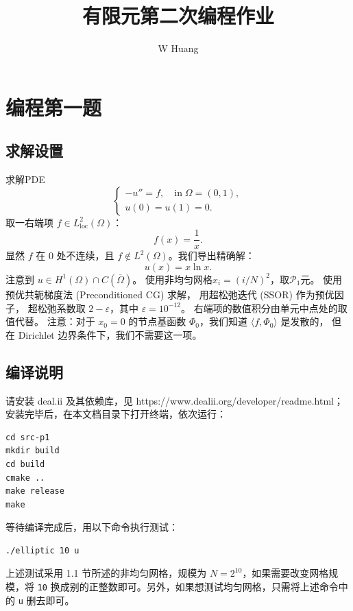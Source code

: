 \documentclass[lang=cn,11pt,a4paper]{elegantpaper}
\title{有限元第二次编程作业}
\author{W Huang}
\date{\zhtoday}
\begin{document}
\maketitle

\section{编程第一题}

\subsection{求解设置}

求解PDE
\begin{equation}
    \left\{
        \begin{array}{l}
            -u'' = f,\quad \text{in}\;\Omega=(0,1),\\
            u(0) = u(1) = 0.
        \end{array}
    \right.
\end{equation}
取一右端项 $f\in L_\text{loc}^2(\Omega)$：
\begin{equation}
    f(x)=\frac{1}{x}.
\end{equation}
显然 $f$ 在 $0$ 处不连续，且 $f\notin L^2(\Omega)$。我们导出精确解：
\begin{equation}
    u(x)=x\ln x.
\end{equation}
注意到 $u\in H^1(\Omega)\cap C(\overline{\Omega})$。
使用非均匀网格$x_i=(i/N)^2$，取$\mathcal{P}_1$元。
使用预优共轭梯度法 (Preconditioned CG) 求解，
用超松弛迭代 (SSOR) 作为预优因子，
超松弛系数取 $2-\varepsilon$，其中 $\varepsilon=10^{-12}$。
右端项的数值积分由单元中点处的取值代替。
注意：对于 $x_0=0$ 的节点基函数 $\Phi_0$，我们知道
$\langle f, \Phi_0 \rangle$ 是发散的，
但在 Dirichlet 边界条件下，我们不需要这一项。

\subsection{编译说明}

请安装 deal.ii 及其依赖库，见 https://www.dealii.org/developer/readme.html；安装完毕后，在本文档目录下打开终端，依次运行：
\begin{lstlisting}
cd src-p1
mkdir build
cd build
cmake ..
make release
make
\end{lstlisting}
等待编译完成后，用以下命令执行测试：
\begin{lstlisting}
./elliptic 10 u
\end{lstlisting}
上述测试采用 1.1 节所述的非均匀网格，规模为 $N=2^{10}$，如果需要改变网格规模，将 \verb|10| 换成别的正整数即可。另外，如果想测试均匀网格，只需将上述命令中的 \verb|u| 删去即可。
\end{document}
